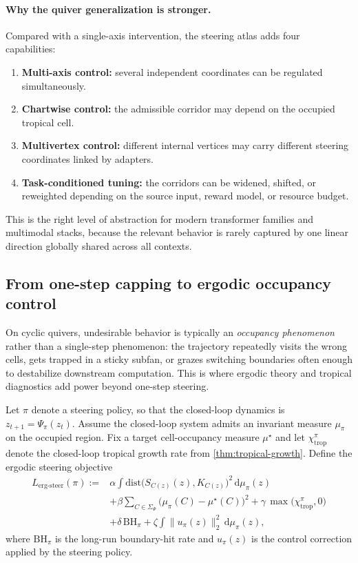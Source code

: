 \documentclass[11pt]{article}
\theoremstyle{definition}
\theoremstyle{plain}
\theoremstyle{remark}
\begin{document}
\paragraph{Why the quiver generalization is stronger.}
Compared with a single-axis intervention, the steering atlas adds four capabilities:
\begin{enumerate}[leftmargin=2em]
\item \textbf{Multi-axis control:} several independent coordinates can be regulated simultaneously.
\item \textbf{Chartwise control:} the admissible corridor may depend on the occupied tropical cell.
\item \textbf{Multivertex control:} different internal vertices may carry different steering coordinates linked by adapters.
\item \textbf{Task-conditioned tuning:} the corridors can be widened, shifted, or reweighted depending on the source input, reward model, or resource budget.
\end{enumerate}
This is the right level of abstraction for modern transformer families and multimodal stacks, because the relevant behavior is rarely captured by one linear direction globally shared across all contexts.

\subsection{From one-step capping to ergodic occupancy control}
\label{sec:ergodic-occupancy-control}

On cyclic quivers, undesirable behavior is typically an \emph{occupancy phenomenon} rather than a single-step phenomenon:
the trajectory repeatedly visits the wrong cells, gets trapped in a sticky subfan, or grazes switching boundaries often enough to destabilize downstream computation.
This is where ergodic theory and tropical diagnostics add power beyond one-step steering.

Let $\pi$ denote a steering policy, so that the closed-loop dynamics is $z_{t+1}=\Psi_\pi(z_t)$.
Assume the closed-loop system admits an invariant measure $\mu_\pi$ on the occupied region.
Fix a target cell-occupancy measure $\mu^\star$ and let $\chi_{\mathrm{trop}}^\pi$ denote the closed-loop tropical growth rate from \cref{thm:tropical-growth}.
Define the ergodic steering objective
\begin{equation}
\begin{aligned}
L_{\mathrm{erg\text{-}steer}}(\pi)
:={}&
\alpha \int \mathrm{dist}\!\bigl(S_{C(z)}(z),K_{C(z)}\bigr)^2\,\mathrm{d}\mu_\pi(z) \\
&+
\beta \sum_{C\in\Sigma_\Psi}\bigl(\mu_\pi(C)-\mu^\star(C)\bigr)^2
+
\gamma\,\max\!\bigl(\chi_{\mathrm{trop}}^\pi,0\bigr) \\
&+
\delta\,\mathrm{BH}_\pi
+
\zeta \int \|u_\pi(z)\|_2^2\,\mathrm{d}\mu_\pi(z),
\end{aligned}
\label{eq:ergodic-steer}
\end{equation}
where $\mathrm{BH}_\pi$ is the long-run boundary-hit rate and $u_\pi(z)$ is the control correction applied by the steering policy.
\end{document}
